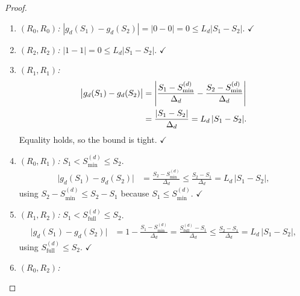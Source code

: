 \documentclass[12pt,openany]{book}
\numberwithin{equation}{chapter}
\theoremstyle{plain}
\theoremstyle{definition}
\theoremstyle{remark}
\def\mathcal#1{#1}%
\begin{document}
\begin{proof}
\begin{enumerate}
\begin{enumerate}
  \item \emph{$(R_0, R_0)$:}
        $|g_d(\mathcal{S}_1) - g_d(\mathcal{S}_2)| = |0 - 0| = 0
        \leq L_d|\mathcal{S}_1 - \mathcal{S}_2|$.
        \hfill$\checkmark$
  \item \emph{$(R_2, R_2)$:}
        $|1 - 1| = 0 \leq L_d|\mathcal{S}_1 - \mathcal{S}_2|$.
        \hfill$\checkmark$
  \item \emph{$(R_1, R_1)$:}
        \begin{align}
          \bigl|g_d(\mathcal{S}_1) - g_d(\mathcal{S}_2)\bigr|
          &= \left|\frac{\mathcal{S}_1-\mathcal{S}_{\min}^{(d)}}{\Delta_d}
             - \frac{\mathcal{S}_2-\mathcal{S}_{\min}^{(d)}}{\Delta_d}\right|
          \notag\\
          &= \frac{|\mathcal{S}_1 - \mathcal{S}_2|}{\Delta_d}
          = L_d\,|\mathcal{S}_1 - \mathcal{S}_2|.
          \label{eq:R1R1-lip}
        \end{align}
        Equality holds, so the bound is tight. \hfill$\checkmark$
  \item \emph{$(R_0, R_1)$:}
        $\mathcal{S}_1 < \mathcal{S}_{\min}^{(d)} \leq \mathcal{S}_2$.
        \begin{align}
          \bigl|g_d(\mathcal{S}_1)-g_d(\mathcal{S}_2)\bigr|
          &= \frac{\mathcal{S}_2-\mathcal{S}_{\min}^{(d)}}{\Delta_d}
          \leq \frac{\mathcal{S}_2-\mathcal{S}_1}{\Delta_d}
          = L_d\,|\mathcal{S}_1-\mathcal{S}_2|,
          \label{eq:R0R1-lip}
        \end{align}
        using
        $\mathcal{S}_2-\mathcal{S}_{\min}^{(d)}
         \leq \mathcal{S}_2 - \mathcal{S}_1$
        because $\mathcal{S}_1 \leq \mathcal{S}_{\min}^{(d)}$.
        \hfill$\checkmark$
  \item \emph{$(R_1, R_2)$:}
        $\mathcal{S}_1 < \mathcal{S}_{\mathrm{full}}^{(d)}
         \leq \mathcal{S}_2$.
        \begin{align}
          \bigl|g_d(\mathcal{S}_1)-g_d(\mathcal{S}_2)\bigr|
          &= 1 - \frac{\mathcal{S}_1-\mathcal{S}_{\min}^{(d)}}{\Delta_d}
          = \frac{\mathcal{S}_{\mathrm{full}}^{(d)}-\mathcal{S}_1}{\Delta_d}
          \leq \frac{\mathcal{S}_2-\mathcal{S}_1}{\Delta_d}
          = L_d\,|\mathcal{S}_1-\mathcal{S}_2|,
          \label{eq:R1R2-lip}
        \end{align}
        using
        $\mathcal{S}_{\mathrm{full}}^{(d)} \leq \mathcal{S}_2$.
        \hfill$\checkmark$
  \item \emph{$(R_0, R_2)$:}

\end{enumerate}
\end{enumerate}
\end{proof}
\end{document}
